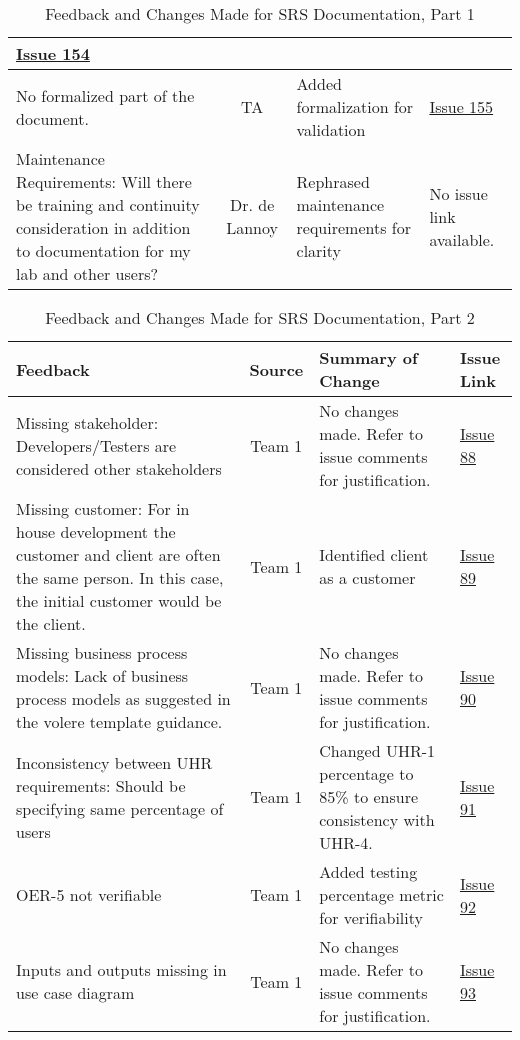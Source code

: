 \documentclass{article}
\begin{document}
\begin{table}[H]
\begin{tabularx}{\textwidth}{|X|c|X|p{1cm}|}
    \href{https://github.com/SumanyaG/Alkalytics/issues/154}{Issue 154}
    \\
    \hline
    No formalized part of the document. & TA & Added formalization for
    validation & \href{https://github.com/SumanyaG/Alkalytics/issues/155}{Issue
    155} \\
    \hline
    Maintenance Requirements: Will there be training and continuity
    consideration in addition to documentation for my lab and other users? & Dr.
    de Lannoy & Rephrased maintenance requirements for clarity & No issue link
    available. \\
    \hline
\end{tabularx}
\caption{Feedback and Changes Made for SRS Documentation, Part 1}
\label{table:SRS1}
\end{table}

\begin{table}[H]
\centering
\begin{tabularx}{\textwidth}{|X|c|X|p{1cm}|}
    \hline
    \textbf{Feedback} & \textbf{Source} & \textbf{Summary of Change} &
    \textbf{Issue Link} \\
    \hline
    Missing stakeholder: Developers/Testers are considered other stakeholders &
    Team 1 & No changes made. Refer to issue comments for justification. &
    \href{https://github.com/SumanyaG/Alkalytics/issues/88}{Issue 88}\\
    \hline
    Missing customer: For in house development the customer and client are often
    the same person. In this case, the initial customer would be the client. &
    Team 1 & Identified client as a customer &
    \href{https://github.com/SumanyaG/Alkalytics/issues/89}{Issue 89}\\
    \hline
    Missing business process models: Lack of business process models as
    suggested in the volere template guidance. & Team 1 & No changes made. Refer
    to issue comments for justification. &
    \href{https://github.com/SumanyaG/Alkalytics/issues/90}{Issue 90}\\
    \hline
    Inconsistency between UHR requirements: Should be specifying same percentage
    of users & Team 1 & Changed UHR-1 percentage to 85\% to ensure consistency
    with UHR-4. & \href{https://github.com/SumanyaG/Alkalytics/issues/91}{Issue
    91}\\
    \hline
    OER-5 not verifiable & Team 1 & Added testing percentage metric for
    verifiability &
    \href{https://github.com/SumanyaG/Alkalytics/issues/92}{Issue 92} \\
    \hline
    Inputs and outputs missing in use case diagram & Team 1 & No changes made.
    Refer to issue comments for justification. &
    \href{https://github.com/SumanyaG/Alkalytics/issues/93}{Issue 93}\\
    \hline
\end{tabularx}
\caption{Feedback and Changes Made for SRS Documentation, Part 2}
\label{table:SRS2}
\end{table}
\end{document}
